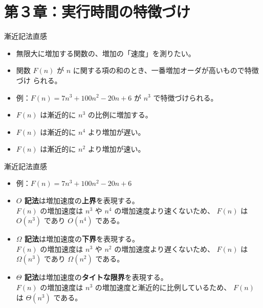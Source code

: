 \documentclass[unicode,11pt,aspectratio=169,hide notes]{beamer} %
\begin{document}
\section*{第３章：実行時間の特徴づけ}

\begin{frame}
  \sectionpage
\end{frame}

\begin{frame}{漸近記法}{直感}
  \begin{itemize}
    \item 無限大に増加する関数の、増加の「速度」を測りたい。
    \item 関数 $F(n)$ が $n$ に関する項の和のとき、一番増加オーダが高いもので特徴づけ
    られる。
    \item 例：$F(n) = 7n^3 + 100n^2 - 20n + 6$ が $n^3$ で特徴づけられる。
    \item $F(n)$ は漸近的に $n^3$ の比例に増加する。
    \item $F(n)$ は漸近的に $n^4$ より増加が遅い。
    \item $F(n)$ は漸近的に $n^2$ より増加が速い。
  \end{itemize}
\end{frame}

\begin{frame}{漸近記法}{直感}
  \begin{itemize}
    \item 例：$F(n) = 7n^3 + 100n^2 - 20n + 6$
    \item \textbf{$O$ 記法}は増加速度の\textbf{上界}を表現する。\\
    $F(n)$ の増加速度は $n^3$ や $n^4$ の増加速度より速くないため、
    $F(n)$ は $O(n^3)$ であり $O(n^4)$ である。
    \item \textbf{$\Omega$ 記法}は増加速度の\textbf{下界}を表現する。\\
    $F(n)$ の増加速度は $n^3$ や $n^2$ の増加速度より遅くないため、
    $F(n)$ は $\Omega(n^3)$ であり $\Omega(n^2)$ である。
    \item \textbf{$\Theta$ 記法}は増加速度の\textbf{タイトな限界}を表現する。\\
    $F(n)$ の増加速度は $n^3$ の増加速度と漸近的に比例しているため、
    $F(n)$ は $\Theta(n^3)$ である。
  \end{itemize}
\end{frame}
\end{document}
